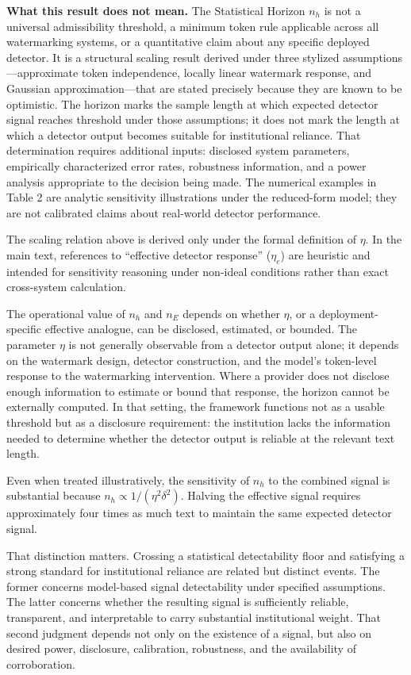 \documentclass[11pt]{article}
\begin{document}
\noindent\textbf{What this result does not mean.} The Statistical Horizon $n_h$ is
not a universal admissibility threshold, a minimum token rule applicable across all
watermarking systems, or a quantitative claim about any specific deployed detector.
It is a structural scaling result derived under three stylized
assumptions---approximate token independence, locally linear watermark response,
and Gaussian approximation---that are stated precisely because they are known to be
optimistic. The horizon marks the sample length at which expected detector signal
reaches threshold under those assumptions; it does not mark the length at which a
detector output becomes suitable for institutional reliance. That determination
requires additional inputs: disclosed system parameters, empirically characterized
error rates, robustness information, and a power analysis appropriate to the
decision being made. The numerical examples in Table 2 are analytic sensitivity
illustrations under the reduced-form model; they are not calibrated claims about
real-world detector performance.

The scaling relation above is derived only under the formal definition of $\eta$.
In the main text, references to ``effective detector response'' ($\eta_{e}$) are
heuristic and intended for sensitivity reasoning under non-ideal conditions rather
than exact cross-system calculation.

The operational value of $n_h$ and $n_E$ depends on whether $\eta$, or a
deployment-specific effective analogue, can be disclosed, estimated, or bounded. The parameter $\eta$ is not
generally observable from a detector output alone; it depends on the watermark
design, detector construction, and the model's token-level response to the
watermarking intervention. Where a provider does not disclose enough information to
estimate or bound that response, the horizon cannot be externally computed. In that
setting, the framework functions not as a usable threshold but as a disclosure
requirement: the institution lacks the information needed to determine whether the
detector output is reliable at the relevant text length.

Even when treated illustratively, the sensitivity of $n_h$ to the combined signal
is substantial because $n_h \propto 1/(\eta^2\delta^2)$. Halving the effective
signal requires approximately four times as much text to maintain the same expected
detector signal.

That distinction matters. Crossing a statistical detectability floor and satisfying
a strong standard for institutional reliance are related but distinct events. The
former concerns model-based signal detectability under specified assumptions. The
latter concerns whether the resulting signal is sufficiently reliable, transparent,
and interpretable to carry substantial institutional weight. That second judgment
depends not only on the existence of a signal, but also on desired power,
disclosure, calibration, robustness, and the availability of corroboration.
\end{document}
